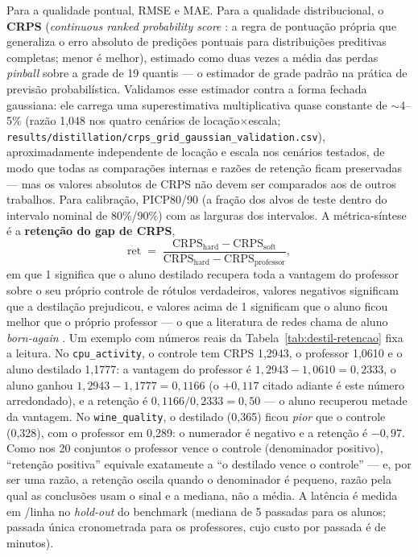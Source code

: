 Para a qualidade pontual, RMSE e MAE. Para a qualidade distribucional,
o \textbf{CRPS} (\emph{continuous ranked probability score}
\citep{gneiting2007}: a regra de pontuação própria que generaliza o
erro absoluto de predições pontuais para distribuições preditivas
completas; menor é melhor), estimado como duas vezes a média das
perdas \emph{pinball} sobre a grade de 19 quantis
\citep{gneiting2011} --- o estimador de grade padrão na prática de
previsão probabilística. Validamos esse estimador contra a forma
fechada gaussiana: ele carrega uma superestimativa multiplicativa
quase constante de ${\sim}4$--5\% (razão 1,048 nos quatro cenários de
locação$\times$escala;
\texttt{results/\allowbreak distillation/\allowbreak crps\_\allowbreak grid\_\allowbreak gaussian\_\allowbreak validation.\allowbreak csv}),
aproximadamente independente de
locação e escala nos cenários testados, de modo que todas as
comparações internas e razões de retenção ficam preservadas --- mas os
valores absolutos de CRPS não devem ser comparados aos de outros
trabalhos. Para calibração, PICP80/90 (a fração dos alvos de teste
dentro do intervalo nominal de 80\%/90\%) com as larguras dos
intervalos. A métrica-síntese é a \textbf{retenção do gap de CRPS},
\begin{equation}
  \mathrm{ret} \;=\;
  \frac{\mathrm{CRPS}_{\mathrm{hard}} - \mathrm{CRPS}_{\mathrm{soft}}}
       {\mathrm{CRPS}_{\mathrm{hard}} - \mathrm{CRPS}_{\mathrm{professor}}},
\label{eq:destil-retencao}
\end{equation}
em que 1 significa que o aluno destilado recupera toda a vantagem do
professor sobre o seu próprio controle de rótulos verdadeiros, valores
negativos significam que a destilação prejudicou, e valores acima de 1
significam que o aluno ficou melhor que o próprio professor --- o que
a literatura de redes chama de aluno \emph{born-again}
\citep{furlanello2018}. Um exemplo com números reais da
Tabela~\ref{tab:destil-retencao} fixa a leitura. No
\texttt{cpu\_activity}, o controle tem CRPS 1,2943, o professor
1,0610
e o aluno destilado 1,1777: a vantagem do professor é
$1{,}2943-1{,}0610=0{,}2333$, o aluno ganhou
$1{,}2943-1{,}1777=0{,}1166$ (o $+0{,}117$ citado adiante é este
número arredondado), e
a retenção é $0{,}1166/0{,}2333=0{,}50$ --- o aluno recuperou metade da
vantagem. No \texttt{wine\_quality}, o destilado (0,365) ficou
\emph{pior} que o controle (0,328), com o professor em 0,289: o
numerador é negativo e a retenção é $-0{,}97$. Como nos 20 conjuntos o
professor vence o controle (denominador positivo), ``retenção
positiva'' equivale exatamente a ``o destilado vence o controle'' ---
e, por ser uma razão, a retenção oscila quando o denominador é pequeno,
razão pela qual as conclusões usam o sinal e a mediana, não a média.
A latência é medida em \us/linha no
\emph{hold-out} do benchmark (mediana de 5 passadas para os alunos; passada
única cronometrada para os professores, cujo custo por passada é de
minutos).

